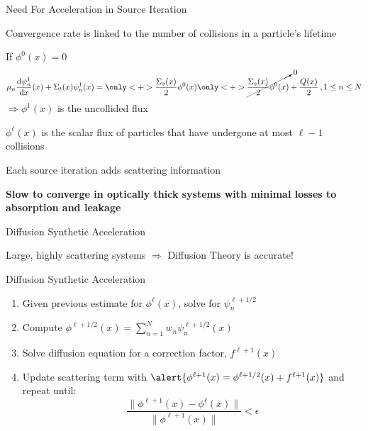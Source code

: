 \documentclass[10pt]{beamer}
\newcommand{\ud}{\mathop{}\!\mathrm{d}} %
\newcommand{\dderiv}[2]{\frac{\ud #1}{\ud #2}}
\begin{document}
\begin{frame}{Need For Acceleration in Source Iteration}

	Convergence rate is linked to the number of collisions in a particle's lifetime

    If $\phi^0(x) = 0$
    \begin{equation*}
        \mu_n \dderiv{\psi_n^{1}}{x}(x) + \Sigma_t(x) \psi_n^{1}(x) =
        \vphantom{\cancelto{0}{\frac{\Sigma_s(x)}{2} \phi^{0}(x)}} 
        \only<+>{\frac{\Sigma_s(x)}{2} \phi^{0}(x)}
        \only<+>{\cancelto{0}{\frac{\Sigma_s(x)}{2} \phi^{0}(x)}}
         + \frac{Q(x)}{2} \,, 1 \leq n \leq N 
    \end{equation*}
    $\Rightarrow \phi^1(x) $ is the uncollided flux 

    $\phi^{\ell}(x)$ is the scalar flux of particles that have undergone at most $\ell - 1$ collisions 

    Each source iteration adds scattering information 

    \textbf{Slow to converge in optically thick systems with minimal losses to absorption and leakage}

\end{frame}

\begin{frame}{Diffusion Synthetic Acceleration}

    Large, highly scattering systems $\Rightarrow$ Diffusion Theory is accurate! 


    \begin{exampleblock}{Diffusion Synthetic Acceleration}
    \begin{enumerate}
        \item Given previous estimate for $\phi^{\ell}(x)$, solve for $\psi_n^{\ell+1/2}$

        \item Compute $\phi^{\ell+1/2}(x) = 
            \sum_{n=1}^N w_n \psi_n^{\ell+1/2}(x)$ 

        \item \alert{Solve diffusion equation for a correction factor, $f^{\ell+1}(x)$}

        \item Update scattering term with 
            $\alert{\phi^{\ell+1}(x) = \phi^{\ell+1/2}(x) + f^{\ell+1}(x)}$ 
        and repeat until: 
             \begin{equation*}
                \frac{\|\phi^{\ell+1}(x) - \phi^{\ell}(x)\|}{\|\phi^{\ell+1}(x)\|} < \epsilon 
             \end{equation*}

    \end{enumerate}
    \end{exampleblock}

\end{frame}
\end{document}
